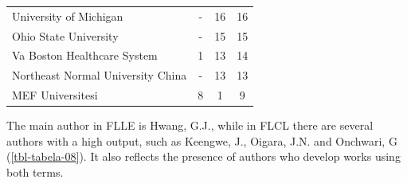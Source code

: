 \documentclass{textolivre-html}
\begin{document}
\begin{table}[htpb]
\begin{tabular}{lccc}
University of Michigan                                & -  & 16 & 16 \\ 
Ohio State University                                 & -  & 15 & 15 \\ 
Va Boston Healthcare System                           & 1  & 13 & 14 \\ 
Northeast Normal University China                     & -  & 13 & 13 \\ 
MEF Universitesi                                      & 8  & 1  & 9  \\ 
\bottomrule
\end{tabular}
\end{table}

The main author in FLLE is Hwang, G.J., while in FLCL there are several authors with a high output, such as Keengwe, J., Oigara, J.N. and Onchwari, G (\cref{tbl-tabela-08}). It also reflects the presence of authors who develop works using both terms.
\end{document}
